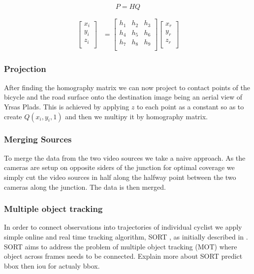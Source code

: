 \begin{equation}
  P = HQ\label{eq:2}
\end{equation} 

\begin{align}
\label{eq:3}
  \begin{bmatrix}
    x_{i} \\
    y_{i} \\
    z_{i} \\
  \end{bmatrix}
  &= \begin{bmatrix}
      h_1 & h_2 & h_3 \\
      h_4 & h_5 & h_6 \\
      h_7 & h_8 & h_9 \\
  \end{bmatrix}
  \begin{bmatrix}
    x_{r} \\
    y_{r} \\
    z_{r} \\
  \end{bmatrix}
\end{align}
\subsubsection{Projection}

After finding the homography matrix we can now project to contact points of the bicycle and the road surface onto the destination
image being an aerial view of Yrsas Plads. This is achieved by applying $z$ to each point as a constant so as to create $Q(x_i, y_i, 1)$ and then we multipy it by 
homography matrix. 
\ \\
\subsubsection{Merging Sources}

To merge the data from the two video sources we take a naive approach. As the cameras are setup on
opposite siders of the junction for optimal coverage we simply cut the video sources in half along the halfway point between
the two cameras along the junction. The data is then merged.
\ \\
\subsubsection{Multiple object tracking}

In order to connect observations into trajectories of individual cyclist we apply 
simple online and real time tracking algorithm, SORT \cite{abewley_abewley/sort_2021}, as initially described in \cite{Bewley2016_sort}. 
SORT aims to address the problem of multiple object tracking (MOT) where object across frames needs to be connected. 
Explain more about SORT predict bbox then iou for actualy bbox.

